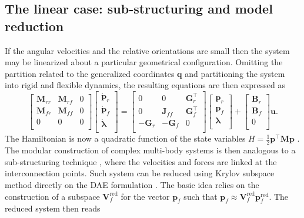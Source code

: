 \documentclass{svjour3}                     %
\begin{document}
	\subsection{The linear case: sub-structuring and model reduction}
	If the angular velocities and the relative orientations are small then the system may be linearized about a particular geometrical configuration. Omitting the partition related to the generalized coordinates $\mathbf{q}$ and partitioning the system into rigid and flexible dynamics, the resulting equations are then expressed as 
	\begin{equation}
	\label{eq:mbd_linear}
	\begin{bmatrix}
	\mathbf{M}_{rr} & \mathbf{M}_{rf} & 0 \\ 
	\mathbf{M}_{fr} & \mathbf{M}_{ff} & 0 \\
	0 & 0 & 0 \\
	\end{bmatrix}
	\begin{bmatrix}
	\dot{\mathbf{p}}_r \\ \dot{\mathbf{p}}_f \\ \dot{\bm{\lambda}} \\ 
	\end{bmatrix} = 
	\begin{bmatrix}
	0 & 0 & \mathbf{G}_r^\top \\ 
	0 & \mathbf{J}_{ff} & \mathbf{G}_f^\top \\ 
	-\mathbf{G}_r & -\mathbf{G}_f & 0 \\
	\end{bmatrix}
	\begin{bmatrix}
	\mathbf{p}_r \\ \mathbf{p}_f \\ {\bm{\lambda}} \\ 
	\end{bmatrix} + 
	\begin{bmatrix}
	\mathbf{B}_r \\ \mathbf{B}_f \\ 0 \\
	\end{bmatrix}\mathbf{u}.
	\end{equation}
	The Hamiltonian is now a quadratic function of the state variables $H = \frac{1}{2} \mathbf{p}^\top\mathbf{M}\mathbf{p}$ \cite{beattie2018linear}.
	The modular construction of complex multi-body systems is then analogous to a sub-structuring technique \cite{substructuring}, where the velocities and forces are linked at the interconnection points. Such system can be reduced using Krylov subspace method directly on the DAE formulation \cite{phdae_red}. The basic idea relies on the construction of a subspace $\mathbf{V}_f^{\text{red}}$ for the vector $\mathbf{p}_f$ such that $\mathbf{p}_f \approx \mathbf{V}_f^{\text{red}} \mathbf{p}_f^{\text{red}}$. The reduced system then reads
\end{document}
